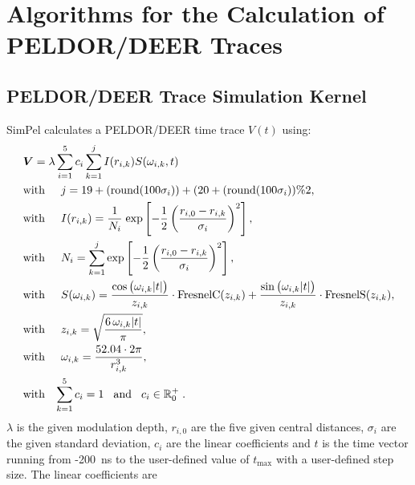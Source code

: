 \documentclass[pdftex,bezier,german,a4,twoside, headexclude,12pt,nochapterprefix, titlepage]{extarticle}
\newcommand{\simpel}{\textsf{SimPel}}
\begin{document}
\section{Algorithms for the Calculation of PELDOR/DEER Traces}
\subsection{PELDOR/DEER Trace Simulation Kernel}
\simpel{} calculates a PELDOR/DEER time trace $V(t)$ using:
\begin{align}
\begin{split}
& \boldsymbol{V}=  \lambda \sum_{i=1}^5 c_i\sum_{k=1}^{j}I(r_{i,k})S(\omega_{i,k},t) \\
&\mbox{with}\hspace{0.5cm} j =  19+(\mathrm{round}(100\sigma_i)) + (20+(\mathrm{round}(100\sigma_i))\%2,\\
&\mbox{with}\hspace{0.5cm} I(r_{i,k}) =\dfrac{1}{N_{i}} \;
\mathrm{exp}\left[-\frac{1}{2}\left(\frac{r_{i,0}-r_{i,k}}{\sigma_i}\right)^2\right],\\
&\mbox{with}\hspace{0.5cm} N_{i} = \sum_{k=1}^{j}\mathrm{exp}\left[-\frac{1}{2}\left(\frac{r_{i,0}-r_{i,k}}{\sigma_i}\right)^2\right] ,\\
&\mbox{with}\hspace{0.5cm}S(\omega_{i,k}) = 
\frac{\cos{\big(\omega_{i,k}|t| \big)}}{z_{i,k}} \cdot \text{FresnelC}(z_{i,k})  + 
   \frac{\sin{\big(\omega_{i,k} |t|\big)}}{z_{i,k}} \cdot \text{FresnelS}(z_{i,k}),\\
  &\mbox{with}\hspace{0.5cm}  z_{i,k} = \sqrt{\frac{6\,\omega_{i,k} |t| }{\pi}},\\
&\mbox{with}\hspace{0.5cm} \omega_{i,k} = \dfrac{52.04\cdot 2 \pi}{r_{i,k}^3},\\ 
&\mbox{with}\hspace{0.3cm} \sum_{k=1}^{5}c_i = 1 \hspace{0.3cm}
\mbox{and}\hspace{0.3cm}c_i \in\mathbb{R}^+_0\; .
\label{PELDOR_kernel_function}
\end{split}
\end{align}
$\lambda$ is the given modulation depth, $r_{i,0}$ are the five given central distances, $\sigma_i$ are
the given standard deviation, $c_i$ are the linear coefficients and $t$ is the time vector running
from -200~ns to the user-defined value of $t_{\mathrm{max}}$ with a user-defined step size. The linear coefficients are
\end{document}
